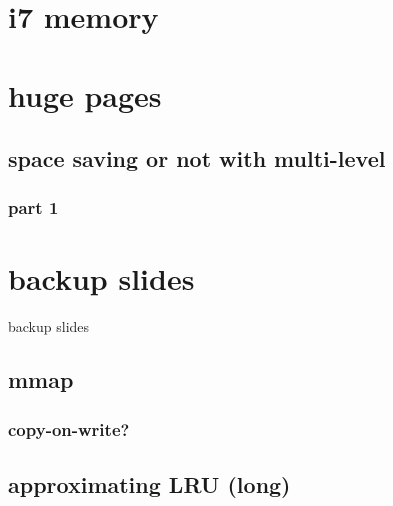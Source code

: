 \section{i7 memory}


\section{huge pages}


\subsection{space saving or not with multi-level}


\subsubsection{part 1}


\section{backup slides}
\begin{frame}{backup slides}
\end{frame}

\subsection{mmap}


\subsubsection{copy-on-write?} %


\subsection{approximating LRU (long)}



